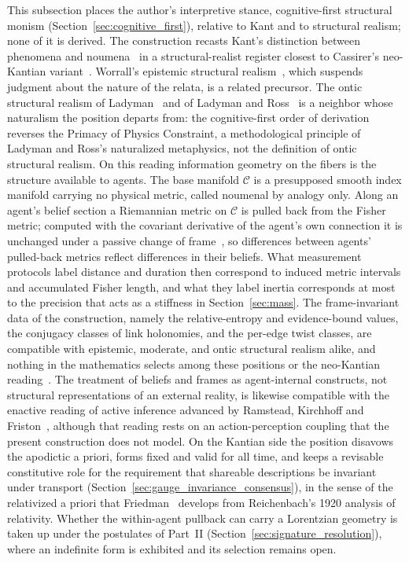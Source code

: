 This subsection places the author's interpretive stance, cognitive-first structural monism (Section~\ref{sec:cognitive_first}), relative to Kant and to structural realism; none of it is derived. The construction recasts Kant's distinction between phenomena and noumena~\cite{Kant1781} in a structural-realist register closest to Cassirer's neo-Kantian variant~\cite{Cassirer1923}. Worrall's epistemic structural realism~\cite{Worrall1989}, which suspends judgment about the nature of the relata, is a related precursor. The ontic structural realism of Ladyman~\cite{Ladyman1998} and of Ladyman and Ross~\cite{Ladyman2007} is a neighbor whose naturalism the position departs from: the cognitive-first order of derivation reverses the Primacy of Physics Constraint, a methodological principle of Ladyman and Ross's naturalized metaphysics, not the definition of ontic structural realism. On this reading information geometry on the fibers is the structure available to agents. The base manifold $\mathcal{C}$ is a presupposed smooth index manifold carrying no physical metric, called noumenal by analogy only. Along an agent's belief section a Riemannian metric on $\mathcal{C}$ is pulled back from the Fisher metric; computed with the covariant derivative of the agent's own connection it is unchanged under a passive change of frame~\cite[Ch.~B2]{DennisGaugeVFESuppB2026}, so differences between agents' pulled-back metrics reflect differences in their beliefs. What measurement protocols label distance and duration then correspond to induced metric intervals and accumulated Fisher length, and what they label inertia corresponds at most to the precision that acts as a stiffness in Section~\ref{sec:mass}. The frame-invariant data of the construction, namely the relative-entropy and evidence-bound values, the conjugacy classes of link holonomies, and the per-edge twist classes, are compatible with epistemic, moderate, and ontic structural realism alike, and nothing in the mathematics selects among these positions or the neo-Kantian reading~\cite[Ch.~14]{DennisGaugeVFE2026}. The treatment of beliefs and frames as agent-internal constructs, not structural representations of an external reality, is likewise compatible with the enactive reading of active inference advanced by Ramstead, Kirchhoff and Friston~\cite{Ramstead2019}, although that reading rests on an action-perception coupling that the present construction does not model. On the Kantian side the position disavows the apodictic a priori, forms fixed and valid for all time, and keeps a revisable constitutive role for the requirement that shareable descriptions be invariant under transport (Section~\ref{sec:gauge_invariance_consensus}), in the sense of the relativized a priori that Friedman~\cite{Friedman2001} develops from Reichenbach's 1920 analysis of relativity. Whether the within-agent pullback can carry a Lorentzian geometry is taken up under the postulates of Part~II (Section~\ref{sec:signature_resolution}), where an indefinite form is exhibited and its selection remains open.


